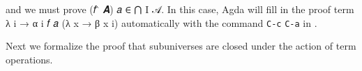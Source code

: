 \noindent and we must prove (\ab 𝑓 \af ̂ \ab 𝑨) \ab 𝑎 \af ∈ \af ⋂ \ab I \ab 𝒜. In this case, Agda will fill in the proof term \as λ \ab i \as → \ab α \ab i \ab 𝑓 \ab 𝑎 \as (λ \ab x \as → \ab β \ab x \ab i) automatically with the command \texttt{C-c} \texttt{C-a} in \agdamode.

Next we formalize the proof that subuniverses are closed under the action of term operations.
\ccpad
\begin{code}%
\>[1]\AgdaSpace{}%
\AgdaSymbol{:}%
\>[102I]\AgdaSymbol{\{}\AgdaSpace{}%
\AgdaSymbol{:}\AgdaSpace{}%
\AgdaSymbol{\}\{}\AgdaSpace{}%
\AgdaSymbol{:}\AgdaSpace{}%
\AgdaSpace{}%
\AgdaSymbol{\}(}\AgdaSpace{}%
\AgdaSymbol{:}\AgdaSpace{}%
\AgdaSpace{}%
\AgdaSpace{}%
\AgdaSymbol{)\{}\AgdaSpace{}%
\AgdaSymbol{:}\AgdaSpace{}%
\AgdaSpace{}%
\AgdaSpace{}%
\AgdaSpace{}%
\AgdaSpace{}%
\AgdaSymbol{\}}\<%
\\
\>[1][@{}l@{\AgdaIndent{0}}]%
\>[2]%
\>[.][@{}l@{}]\<[102I]%
\>[19]\AgdaSymbol{(}\AgdaSpace{}%
\AgdaSpace{}%
\AgdaSpace{}%
\AgdaSymbol{)}\AgdaSpace{}%
\AgdaSpace{}%
\AgdaSymbol{(}\AgdaSpace{}%
\AgdaSymbol{:}\AgdaSpace{}%
\AgdaSpace{}%
\AgdaSymbol{)(}\AgdaSpace{}%
\AgdaSymbol{:}\AgdaSpace{}%
\AgdaSpace{}%
\AgdaSpace{}%
\AgdaSpace{}%
\AgdaSpace{}%
\AgdaSymbol{)}\<%
\\
%
\>[2]%
\>[19]\AgdaSpace{}%
\AgdaSpace{}%
\AgdaSpace{}%
\AgdaSpace{}%
\AgdaSpace{}%
\AgdaSpace{}%
\AgdaSymbol{)}\AgdaSpace{}%
\AgdaSpace{}%
\AgdaSymbol{((}\AgdaSpace{}%
\AgdaSpace{}%
\AgdaSymbol{)}\AgdaSpace{}%
\AgdaSymbol{)}\AgdaSpace{}%
\AgdaSpace{}%
\<%
\\
%
\>[1]\AgdaSpace{}%
\AgdaSpace{}%
\AgdaSpace{}%

\end{code}

